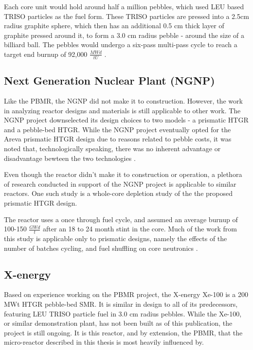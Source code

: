 

Each core unit would hold around half a million pebbles, which used LEU based TRISO particles as the fuel form.  These TRISO particles are pressed into a 2.5cm radius graphite sphere, which then has an additional 0.5 cm thick layer of graphite pressed around it, to form a 3.0 cm radius pebble - around the size of a billiard ball.  The pebbles would undergo a six-pass multi-pass cycle to reach a target end burnup of 92,000 $\frac{MWd}{tU}$ \cite{venter_pbmr_2005}. 

\subsection{Next Generation Nuclear Plant (NGNP)}

Like the PBMR, the NGNP did not make it to construction.  However, the work in analyzing reactor designs and materials is still applicable to other work.  The NGNP project downselected its design choices to two models - a prismatic HTGR and a pebble-bed HTGR.  While the NGNP project eventually opted for the Areva prismatic HTGR design \cite{noauthor_areva_nodate} due to reasons related to pebble costs, it was noted that, technologically speaking, there was no inherent advantage or disadvantage bewteen the two technologies \cite{inl_basis_2011}.

Even though the reactor didn't make it to construction or operation, a plethora of research conducted in support of the NGNP project is applicable to similar reactors.  One such study is a whole-core depletion study of the the proposed prismatic HTGR design.

The reactor uses a once through fuel cycle, and assumed an average burnup of 100-150 $\frac{GWd}{t}$ after an 18 to 24 month stint in the core.  Much of the work from this study is applicable only to prismatic designs, namely the effects of the number of batches cycling, and fuel shuffling on core neutronics \cite{tkkim_whole-core_nodate}.

\subsection{X-energy}

Based on experience working on the PBMR project, the X-energy Xe-100 is a 200 MWt HTGR pebble-bed SMR.  It is similar in design to all of its predecessors, featuring LEU TRISO particle fuel in 3.0 cm radius pebbles.  While the Xe-100, or similar demonstration plant, has not been built as of this publication, the project is still ongoing.  It is this reactor, and by extension, the PBMR, that the micro-reactor described in this thesis is most heavily influenced by.

